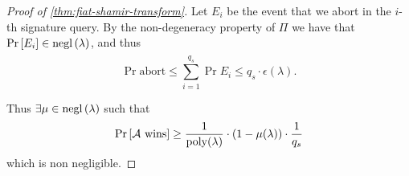 \begin{proof}[Proof of \cref{thm:fiat-shamir-transform}]
	Let $E_i$ be the event that we abort in the $i$-th signature query.
	By the non-degeneracy property of $\Pi$ we have that $\mathop{\mathrm{Pr}}\limits_{} \left[ {E_i} \right] \in \mathrm{negl}\left({\lambda}\right)$, and thus
	\begin{equation*} 
		\Pr{\text{abort}} \le \sum_{i=1}^{q_s} \Pr{E_i} \le q_s \cdot \epsilon(\lambda).
	\end{equation*}

	Thus $\exists \mu \in \mathrm{negl}\left({\lambda}\right)$ such that
	\begin{equation*}
		\mathop{\mathrm{Pr}}\limits_{} \left[ {\text{$\mathcal{A}$ wins}} \right] \ge \frac{1}{\mathrm{poly}(\lambda)} \cdot (1 - \mu(\lambda)) \cdot \frac{1}{q_s}
	\end{equation*}
	which is non negligible.
\end{proof}





